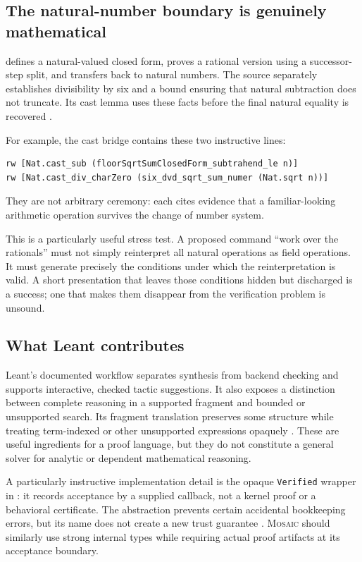 \documentclass[11pt,a4paper]{article}
\newcommand{\code}[1]{\texttt{\small #1}}
\newcommand{\Mosaic}{\textsc{Mosaic}}
\theoremstyle{definition}
\theoremstyle{remark}
\begin{document}
\subsection{The natural-number boundary is genuinely mathematical}
 defines a natural-valued closed form, proves a rational version using a successor-step split, and transfers back to natural numbers. The source separately establishes divisibility by six and a bound ensuring that natural subtraction does not truncate. Its cast lemma uses these facts before the final natural equality is recovered \cite{floorsqrt}.

For example, the cast bridge contains these two instructive lines:
\begin{lstlisting}[basicstyle=\footnotesize\ttfamily]
rw [Nat.cast_sub (floorSqrtSumClosedForm_subtrahend_le n)]
rw [Nat.cast_div_charZero (six_dvd_sqrt_sum_numer (Nat.sqrt n))]
\end{lstlisting}
They are not arbitrary ceremony: each cites evidence that a familiar-looking arithmetic operation survives the change of number system.

This is a particularly useful stress test. A proposed command ``work over the rationals'' must not simply reinterpret all natural operations as field operations. It must generate precisely the conditions under which the reinterpretation is valid. A short presentation that leaves those conditions hidden but discharged is a success; one that makes them disappear from the verification problem is unsound.

\subsection{What Leant contributes}
Leant's documented workflow separates synthesis from backend checking and supports interactive, checked tactic suggestions. It also exposes a distinction between complete reasoning in a supported fragment and bounded or unsupported search. Its fragment translation preserves some structure while treating term-indexed or other unsupported expressions opaquely \cite{leant-readme,leant-fragment}. These are useful ingredients for a proof language, but they do not constitute a general solver for analytic or dependent mathematical reasoning.

A particularly instructive implementation detail is the opaque \code{Verified} wrapper in : it records acceptance by a supplied callback, not a kernel proof or a behavioral certificate. The abstraction prevents certain accidental bookkeeping errors, but its name does not create a new trust guarantee \cite{leant-verification}. \Mosaic{} should similarly use strong internal types while requiring actual proof artifacts at its acceptance boundary.
\end{document}
